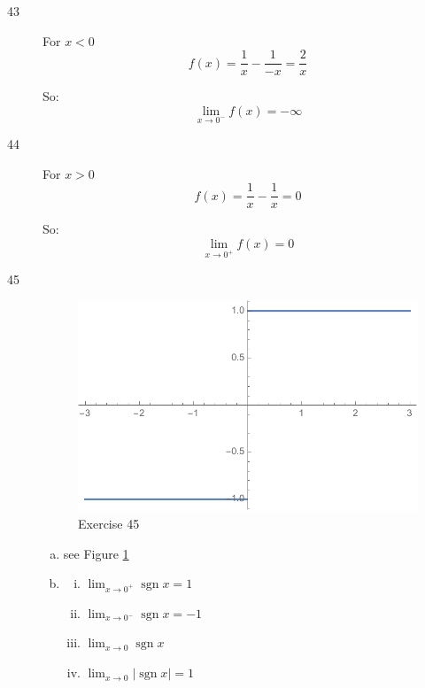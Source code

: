 \documentclass[letterpaper, landscape]{exam}
\newcommand{\sgn}{\operatorname{sgn}}
\begin{document}
\begin{description}
      \item[43]
        For $x < 0$
        \[
          f(x) = \frac{1}{x} - \frac{1}{-x} = \frac{2}{x}
        \]

        So:
        \[
          \lim_{x \to 0^-} f(x) = \boxed{ - \infty }
        \]

      \item[44]
        For $x > 0$
        \[
          f(x) = \frac{1}{x} - \frac{1}{x} = 0
        \]

        So:
        \[
          \lim_{x \to 0^+} f(x) = \boxed{ 0 }
        \]

      \newpage

      \item[45]
        \begin{figure}[H]
          \centering
          \includegraphics[scale = 0.5]{ex45.pdf}
          \caption{Exercise 45}
          \label{fig:ex45}
        \end{figure}

        \begin{enumerate}[(a)]
          \item see Figure \ref{fig:ex45}
          \item
            \begin{enumerate}[(i)]
              \item $\lim_{x \to 0^+} \sgn x = \boxed{ 1 }$
              \item $\lim_{x \to 0^-} \sgn x = \boxed{ -1 }$
              \item $\lim_{x \to 0} \sgn x$ 
              \item $\lim_{x \to 0} |\sgn x| = \boxed{ 1 }$
            \end{enumerate}
        \end{enumerate}


\end{description}
\end{document}
